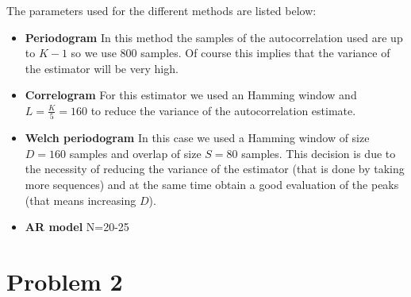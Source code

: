 \documentclass[a4paper, 12pt]{report}
\begin{document}
The parameters used for the different methods are listed below:

\begin{itemize}
	
\item {\bf Periodogram} In this method the samples of the autocorrelation used are up to $K-1$ so we use 800 samples. Of course this implies that the variance of the estimator will be very high.

\item {\bf Correlogram}  For this estimator we used an Hamming window and $L=\frac{K}{5}=160$ to reduce the variance of the autocorrelation estimate.

\item {\bf Welch periodogram} In this case we used a Hamming window of size $D=160$ samples and overlap of size $S=80$ samples. This decision is due to the necessity of reducing the variance of the estimator (that is done by taking more sequences) and at the same time obtain a good evaluation of the peaks (that means increasing $D$).

\item {\bf AR model} N=20-25   %

\end{itemize}

\section*{Problem 2}
\end{document}
